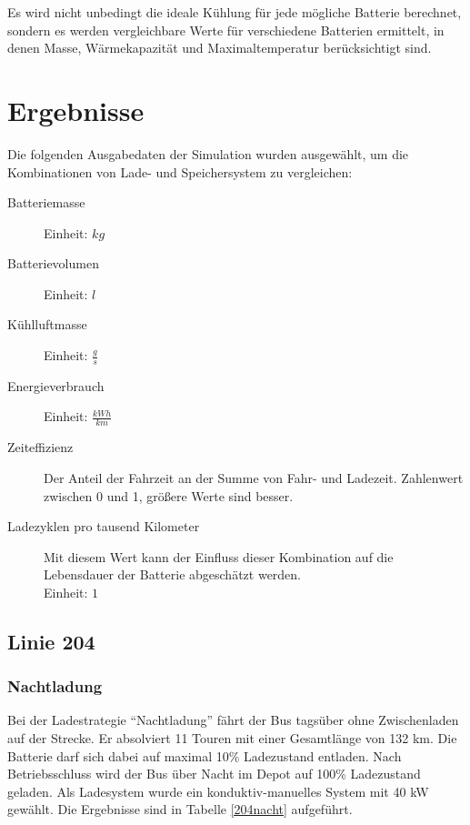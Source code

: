 Es wird nicht unbedingt die ideale Kühlung für jede mögliche Batterie berechnet, sondern es werden vergleichbare Werte für verschiedene Batterien ermittelt, in denen Masse, Wärmekapazität und Maximaltemperatur berücksichtigt sind.

\section{Ergebnisse}
\label{simErgebnisse}
Die folgenden Ausgabedaten der Simulation wurden ausgewählt, um die Kombinationen von Lade- und Speichersystem zu vergleichen:
\begin{description}
	\item[Batteriemasse] Einheit: $kg$
	\item[Batterievolumen] Einheit: $l$
	\item[Kühlluftmasse] Einheit: $\frac{g}{s}$
	\item[Energieverbrauch] Einheit: $\frac{kWh}{km}$
	\item[Zeiteffizienz] Der Anteil der Fahrzeit an der Summe von Fahr- und Ladezeit. Zahlenwert zwischen 0 und 1, größere Werte sind besser.
	\item[Ladezyklen pro tausend Kilometer] Mit diesem Wert kann der Einfluss dieser Kombination auf die Lebensdauer der Batterie abgeschätzt werden.\\
	Einheit: $1$
\end{description}

\subsection{Linie 204}
\subsubsection{Nachtladung}
\label{erkl204nacht}
Bei der Ladestrategie "`Nachtladung"' fährt der Bus tagsüber ohne Zwischenladen auf der Strecke. Er absolviert 11 Touren mit einer Gesamtlänge von 132 km. Die Batterie darf sich dabei auf maximal 10\% Ladezustand entladen. Nach Betriebsschluss wird der Bus über Nacht im Depot auf 100\% Ladezustand geladen. Als Ladesystem wurde ein konduktiv-manuelles System mit 40 kW gewählt. Die Ergebnisse sind in Tabelle \ref{204nacht} aufgeführt.

